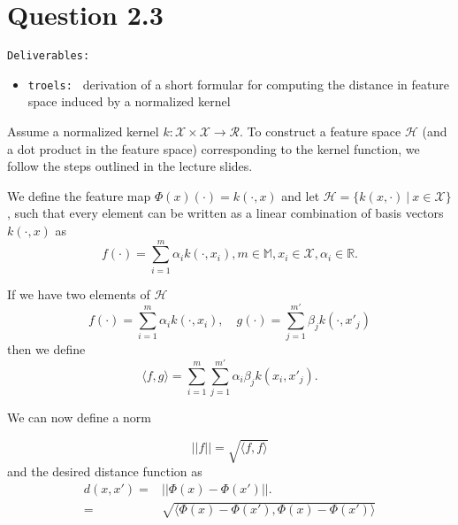 \section*{Question 2.3}

\texttt{Deliverables:} 
\begin{itemize}
	
	\item \texttt{troels: } derivation of a short formular for computing the distance in feature space induced by a normalized kernel 
\end{itemize}

Assume a normalized kernel $k : \mathcal{X} \times \mathcal{X}
\rightarrow \mathcal{R}$.  To construct a feature space $\mathcal{H}$
(and a dot product in the feature space) corresponding to the kernel
function, we follow the steps outlined in the lecture slides.

We define the feature map $\Phi(x)(\cdot) = k(\cdot, x)$ and let
$\mathcal{H}=\{k(x,\cdot)\ |\ x\in\mathcal{X}\}$, such that every
element can be written as a linear combination of basis vectors
$k(\cdot, x)$ as
\[
f(\cdot) = \sum_{i=1}^m\alpha_ik(\cdot,x_i), m\in \mathbb{M},x_i\in\mathcal{X},\alpha_i\in\mathbb{R}.
\]

If we have two elements of $\mathcal{H}$
\[
f(\cdot) = \sum_{i=1}^m\alpha_ik(\cdot,x_i),\quad
g(\cdot) = \sum_{j=1}^{m'}\beta_jk(\cdot,x'_j)
\]
then we define
\[
\langle f, g\rangle = \sum_{i=1}^m\sum_{j=1}^{m'}\alpha_i\beta_jk(x_i,x'_j).
\]

We can now define a norm

\[
||f|| = \sqrt{\langle f, f\rangle}
\]
and the desired distance function as
\begin{align*}
d(x,x') =& ||\Phi(x)-\Phi(x')||.\\
=& \sqrt{\langle \Phi(x)-\Phi(x'), \Phi(x)-\Phi(x')\rangle}
\end{align*}
